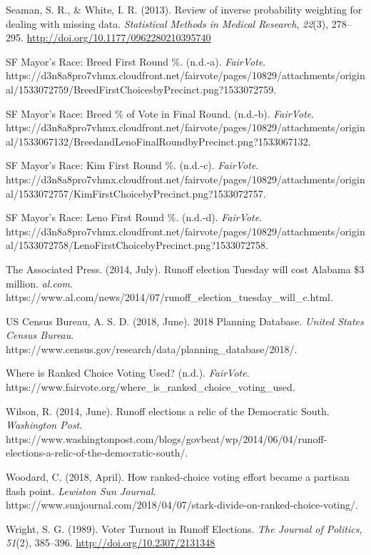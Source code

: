 \documentclass[12pt,twoside]{reedthesis}
\begin{document}
\leavevmode\hypertarget{ref-seaman_review_2013}{}%
Seaman, S. R., \& White, I. R. (2013). Review of inverse probability weighting for dealing with missing data. \emph{Statistical Methods in Medical Research}, \emph{22}(3), 278--295. \url{http://doi.org/10.1177/0962280210395740}

\leavevmode\hypertarget{ref-noauthor_sf_nodate-1}{}%
SF Mayor's Race: Breed First Round \%. (n.d.-a). \emph{FairVote}. https://d3n8a8pro7vhmx.cloudfront.net/fairvote/pages/10829/attachments/original/1533072759/BreedFirstChoicesbyPrecinct.png?1533072759.

\leavevmode\hypertarget{ref-noauthor_sf_nodate}{}%
SF Mayor's Race: Breed \% of Vote in Final Round. (n.d.-b). \emph{FairVote}. https://d3n8a8pro7vhmx.cloudfront.net/fairvote/pages/10829/attachments/original/1533067132/BreedandLenoFinalRoundbyPrecinct.png?1533067132.

\leavevmode\hypertarget{ref-noauthor_sf_nodate-3}{}%
SF Mayor's Race: Kim First Round \%. (n.d.-c). \emph{FairVote}. https://d3n8a8pro7vhmx.cloudfront.net/fairvote/pages/10829/attachments/original/1533072757/KimFirstChoicebyPrecinct.png?1533072757.

\leavevmode\hypertarget{ref-noauthor_sf_nodate-2}{}%
SF Mayor's Race: Leno First Round \%. (n.d.-d). \emph{FairVote}. https://d3n8a8pro7vhmx.cloudfront.net/fairvote/pages/10829/attachments/original/1533072758/LenoFirstChoicebyPrecinct.png?1533072758.

\leavevmode\hypertarget{ref-the_associated_press_runoff_2014}{}%
The Associated Press. (2014, July). Runoff election Tuesday will cost Alabama \$3 million. \emph{al.com}. https://www.al.com/news/2014/07/runoff\_election\_tuesday\_will\_c.html.

\leavevmode\hypertarget{ref-us_census_bureau_2018_2018}{}%
US Census Bureau, A. S. D. (2018, June). 2018 Planning Database. \emph{United States Census Bureau}. https://www.census.gov/research/data/planning\_database/2018/.

\leavevmode\hypertarget{ref-noauthor_where_nodate}{}%
Where is Ranked Choice Voting Used? (n.d.). \emph{FairVote}. https://www.fairvote.org/where\_is\_ranked\_choice\_voting\_used.

\leavevmode\hypertarget{ref-wilson_runoff_2014}{}%
Wilson, R. (2014, June). Runoff elections a relic of the Democratic South. \emph{Washington Post}. https://www.washingtonpost.com/blogs/govbeat/wp/2014/06/04/runoff-elections-a-relic-of-the-democratic-south/.

\leavevmode\hypertarget{ref-woodard_how_2018}{}%
Woodard, C. (2018, April). How ranked-choice voting effort became a partisan flash point. \emph{Lewiston Sun Journal}. https://www.sunjournal.com/2018/04/07/stark-divide-on-ranked-choice-voting/.

\leavevmode\hypertarget{ref-wright_voter_1989}{}%
Wright, S. G. (1989). Voter Turnout in Runoff Elections. \emph{The Journal of Politics}, \emph{51}(2), 385--396. \url{http://doi.org/10.2307/2131348}


\end{document}
